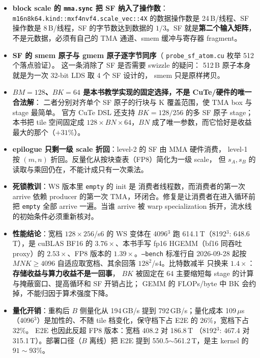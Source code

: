 \begin{itemize}[itemsep=2pt,topsep=3pt]
  \item \textbf{block scale 的 \texttt{mma.sync} 把 SF 纳入了操作数}：
        \texttt{m16n8k64.kind::mxf4nvf4.scale\_vec::4X} 的数据操作数是
        24\,B/线程、SF 操作数是 8\,B/线程，SF 的字节数达到数据的
        $1/3$。SF 就是\textbf{第二个输入矩阵}，不是元数据，必须有自己的
        TMA 通道、smem 缓冲与寄存器 fragment。
  \item \textbf{SF 的 smem 原子与 gmem 原子逐字节同序}（
        \texttt{probe\_sf\_atom.cu} 枚举 512 个落点验证）。
        这一条消除了 SF 是否需要 swizzle 的疑问：
        512\,B 原子本身就是为一次 32-bit LDS 取 4 个 SF 设计的，
        smem 只是原样拷贝。
  \item \textbf{$BM{=}128$、$BK{=}64$ 是本书教学实现的固定选择，不是 CuTe/硬件的唯一合法解}：
        二者分别对齐单个 SF 原子的行块与 K 覆盖范围，使 TMA box 与 stage 最简单。
        官方 CuTe DSL 还支持 $BK{=}128/256$ 的多 SF 原子 stage；本书把 tile 空间固定成
        $128\times BN\times64$，$BN$ 成了唯一参数，而它恰好是收益最大的那个（$+31\%$）。
  \item \textbf{epilogue 只剩一级 scale 折回}：level-2 的 SF 由 MMA 硬件消费，
        level-1 按 $(m,n)$ 折回。反量化从按块查表（FP8）简化为一级 scale，
        但 $s_A,s_B$ 的读取与乘回仍在，不能计成只有一次乘法。
  \item \textbf{死锁教训}：WS 版本里 \texttt{empty} 的 init 是
        消费者线程数，而消费者的第一次 arrive 依赖 producer 的第一次
        TMA，环闭合。修复是让消费者在进入循环前把 \texttt{empty}
        全部 arrive 一遍。当谁 arrive 被 warp specialization
        拆开，流水线的初始条件必须重新核对。
  \item \textbf{性能结论}：宽档 $128\times256$/s6 的 WS 变体在 4096$^3$
        跑 614.1\,T（8192$^3$: 648.6\,T），是 cuBLAS BF16 的
        $3.76\times$、本书手写 fp16 HGEMM（bf16 同吞吐 proxy）的 $2.53\times$、FP8 版本的
        $1.39\times$。\texttt{--bench} 标准行自 2026-09-28 起按
        $MNK\ge4096$ 自适应取宽档、其余回落 $128^2$/s4。比特数减半
        只换来 $1.4\times$：\textbf{存储收益与算力收益不是一回事}，
        $BK$ 被固定在 64 主要缩短每 stage 的计算与掩蔽窗口、提高循环和 SF 开销占比；
        GEMM 的 FLOPs/byte 中 BK 会约掉，不能归因于算术强度下降。
  \item \textbf{量化开销}：重构后 $B$ 侧量化从 194\,GB/s 提到
        792\,GB/s；量化成本 109\,$\mu$s（4096$^3$）是加性的、不随
        tile 档变化，保守档下占 E2E 的 26\%，宽档下占 32\%。
        E2E 也因此反超 FP8 版本：宽档 408.2 对 186.8\,T
        （8192$^3$: 467.4 对 315.1\,T）。部署口径（$B$ 离线）把 E2E
        提到 550.5$\sim$561.2\,T，是主 kernel 的 $91\sim93\%$。
\end{itemize}


